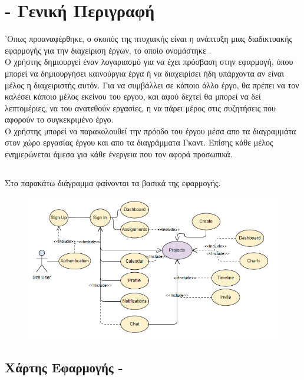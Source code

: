 \section{ - Γενική Περιγραφή}
\pSpace'Οπως προαναφέρθηκε, ο σκοπός της πτυχιακής είναι η ανάπτυξη μιας διαδικτυακής εφαρμογής για την διαχείριση έργων, το οποίο ονομάστηκε .\\
\pSpace Ο χρήστης δημιουργεί έναν λογαριασμό για να έχει πρόσβαση στην εφαρμογή, όπου μπορεί να δημιουργήσει καινούργια έργα ή να διαχειρίσει ήδη υπάρχοντα αν είναι μέλος η διαχειριστής αυτόν. Για να συμβάλλει σε κάποιο άλλο έργο, θα πρέπει να τον καλέσει κάποιο μέλος εκείνου του εργου, και αφού δεχτεί θα μπορεί να δεί λεπτομέριες, να του ανατεθούν εργασίες, η να πάρει μέρος στις συζητήσεις που αφορούν το συγκεκριμένο έργο.\\
\pSpace Ο χρήστης μπορεί να παρακολουθεί την πρόοδο του έργου μέσα απο τα διαγραμμάτα στον χώρο εργασίας έργου και απο τα διαγράμματα Γκαντ. Επίσης κάθε μέλος ενημερώνεται άμεσα για κάθε ένεργεια που τον αφορά προσωπικά.

\subsection*{}
\pSpace Στο παρακάτω  διάγραμμα φαίνονται τα βασικά  της εφαρμογής.
\begin{figure}[ht]
\centering
\includegraphics[scale=1]{images/usecase.jpg}
\caption{}
\label{fig:use_cases}
\end{figure}
\pagebreak

\subsection*{Χάρτης Εφαρμογής - }

